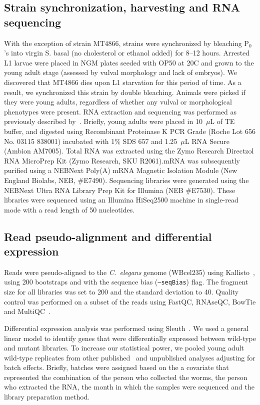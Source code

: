 \documentclass[9pt,twocolumn,twoside]{gsajnl}
\newcommand{\cel}{\emph{C.~elegans}}
\begin{document}
\subsection*{Strain synchronization, harvesting and RNA sequencing}
With the exception of strain MT4866, strains were synchronized by bleaching
P$_0$'s into virgin S. basal (no cholesterol or ethanol added) for 8--12 hours.
Arrested L1 larvae were placed in NGM plates seeded with OP50 at 20\degree{}C
and grown to the young adult stage (assessed by vulval morphology and lack of
embryos). We discovered that MT4866 dies upon L1 starvation for this period of
time. As a result, we synchronized this strain by double bleaching. Animals were
picked if they were young adults, regardless of whether any vulval or
morphological phenotypes were present. RNA extraction and sequencing was
performed as previously described by~\citet{AngelesAlboresHIF,
Angeles-Albores2017}. Briefly, young adults were placed in 10~$\mu$L of TE
buffer,  and digested using  Recombinant Proteinase K PCR Grade (Roche Lot 656
No. 03115 838001) incubated with 1\% SDS 657 and 1.25~$\mu$L RNA Secure (Ambion
AM7005). Total RNA was extracted using the Zymo Research Directzol RNA MicroPrep
Kit (Zymo Research, SKU R2061).\@ mRNA was subsequently purified using a NEBNext
Poly(A) mRNA Magnetic Isolation Module (New England Biolabs, NEB, \#E7490).
Sequencing libraries were generated using the NEBNext Ultra RNA Library Prep Kit
for Illumina (NEB \#E7530). These libraries were sequenced using an Illumina
HiSeq2500 machine in single-read mode with a read length of 50 nucleotides.

\subsection*{Read pseudo-alignment and differential expression}
Reads were pseudo-aligned to the \cel{} genome (WBcel235) using
Kallisto~\citep{Bray2016}, using 200 bootstraps and with the sequence bias
(\texttt{--seqBias}) flag. The fragment size for all libraries was set to 200
and the standard deviation to 40. Quality control was performed on a subset of
the reads using FastQC, RNAseQC, BowTie and MultiQC~\citep{Andrews2010,
Deluca2012, Langmead2009, Ewels2016}.

Differential expression analysis was performed using
Sleuth~\citep{Pimentel2016a}. We used a general linear model to identify genes
that were differentially expressed between wild-type and mutant libraries. To
increase our statistical power, we pooled young adult wild-type replicates from
other published~\citep{AngelesAlboresHIF, Angeles-Albores2017} and unpublished
analyses adjusting for batch effects. Briefly, batches were assigned based on
the a covariate that represented the combination of the person who collected the
worms, the person who extracted the RNA, the month in which the samples were
sequenced and the library preparation method.
\end{document}
